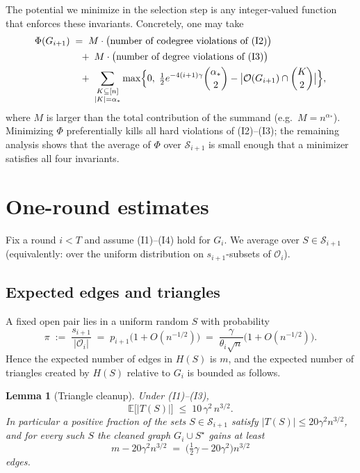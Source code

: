 \documentclass[11pt]{article}
\newtheorem{lemma}[theorem]{Lemma}
\theoremstyle{definition}
\newcommand{\cO}{\mathcal{O}}
\newcommand{\bin}[2]{\binom{#1}{#2}}
\begin{document}
The potential we minimize in the selection step is any integer-valued function that enforces these invariants.
Concretely, one may take
\begin{align*}
  \Phi(G_{i+1})
  &\;=\;
  M\cdot\bigl(\text{number of codegree violations of (I2)}\bigr)\\
  &\quad
  +\;
  M\cdot\bigl(\text{number of degree violations of (I3)}\bigr)\\
  &\quad
  +\;
  \sum_{\substack{K\subseteq[n]\\ |K|=\alpha_{*}}}
  \max\Bigl\{0,\;
    \tfrac12 e^{-4(i+1)\gamma}\bin{\alpha_{*}}{2}
    -
    \bigl|\cO(G_{i+1})\cap\bin{K}{2}\bigr|
  \Bigr\},
\end{align*}
where $M$ is larger than the total contribution of the summand (e.g.\ $M=n^{\alpha_{*}}$).
Minimizing $\Phi$ preferentially kills all hard violations of (I2)--(I3); the remaining analysis shows that the average of $\Phi$ over $\mathcal{S}_{i+1}$ is small enough that a minimizer satisfies all four invariants.

\section{One-round estimates}

Fix a round $i<T$ and assume (I1)--(I4) hold for $G_i$.
We average over $S\in\mathcal{S}_{i+1}$ (equivalently: over the uniform distribution on $s_{i+1}$-subsets of $\cO_i$).

\subsection{Expected edges and triangles}

A fixed open pair lies in a uniform random $S$ with probability
\[
  \pi \;:=\; \frac{s_{i+1}}{|\cO_i|} \;=\; p_{i+1}\bigl(1+O(n^{-1/2})\bigr)
  \;=\; \frac{\gamma}{\theta_i\sqrt{n}}\bigl(1+O(n^{-1/2})\bigr).
\]
Hence the expected number of edges in $H(S)$ is $m$, and the expected number of triangles created by $H(S)$ relative to $G_i$ is bounded as follows.

\begin{lemma}[Triangle cleanup]\label{lem:clean}
Under (I1)--(I3),
\[
  \mathbb{E}\bigl[|T(S)|\bigr]
  \;\le\;
  10\,\gamma^{2}\, n^{3/2}.
\]
In particular a positive fraction of the sets $S\in\mathcal{S}_{i+1}$ satisfy $|T(S)|\le 20\gamma^{2} n^{3/2}$, and for every such $S$ the cleaned graph $G_i\cup S^\star$ gains at least
\[
  m - 20\gamma^{2} n^{3/2}
  \;=\;
  \bigl(\tfrac12\gamma - 20\gamma^{2}\bigr)n^{3/2}
\]
edges.
\end{lemma}
\end{document}
